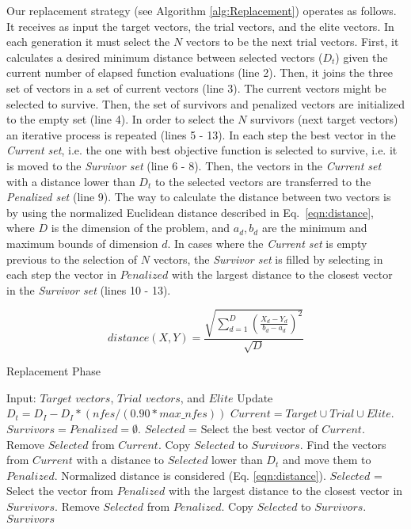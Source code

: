 Our replacement strategy (see Algorithm \ref{alg:Replacement}) operates as follows.
%
It receives as input the target vectors, the trial vectors, and the elite vectors.
%
In each generation it must select the $N$ vectors to be the next trial vectors.
%
First, it calculates a desired minimum distance between selected vectors ($D_t$) given the current number of elapsed function evaluations (line 2).
%
Then, it joins the three set of vectors in a set of current vectors (line 3).
%
The current vectors might be selected to survive.
%
Then, the set of survivors and penalized vectors are initialized to the empty set (line 4).
%
In order to select the $N$ survivors (next target vectors) an iterative process is repeated (lines 5 - 13).
%
In each step the best vector in the \textit{Current set}, i.e. the one with best objective function is selected
to survive, i.e. it is moved to the \textit{Survivor set} (line 6 - 8).
%
Then, the vectors in the \textit{Current set} with a distance lower than $D_t$ to the selected vectors are transferred to the \textit{Penalized set} (line 9).
%
The way to calculate the distance between two vectors is by using the normalized Euclidean distance described in Eq.~\ref{eqn:distance}, where $D$ is the dimension of the problem, and $a_d, b_d$ are the minimum and maximum bounds of dimension $d$.
%
%
In cases where the \textit{Current set} is empty previous to the selection of $N$ vectors, the \textit{Survivor set} is filled by selecting in each step 
the vector in $Penalized$ with the largest distance to the closest vector in the \textit{Survivor set} (lines 10 - 13).

\begin{equation}\label{eqn:distance}
distance ( X, Y ) = \frac{\sqrt{ \sum_{d=1}^D \left ( \frac{X_d - Y_d}{b_d - a_d} \right )^2  }} {\sqrt{D}}
\end{equation}


\begin{algorithm}[t]
  \scriptsize
	\caption{Replacement Phase} \label{alg:Replacement}
	\begin{algorithmic}[1]
	\STATE Input: $Target$ $vectors$, $Trial$ $vectors$, and $Elite$
	\STATE Update $D_t = D_I - D_I *(nfes/(0.90*max\_nfes)) $ 
	\STATE $Current = Target \cup Trial\cup Elite$.
	\STATE $Survivors = Penalized = \emptyset$.
	   \STATE $Selected$ = Select the best vector of $Current$.
		 \STATE Remove $Selected$ from $Current$.
	   \STATE Copy $Selected$ to $Survivors$.
	   \STATE Find the vectors from $Current$ with a distance to $Selected$ lower than $D_t$ and move them to $Penalized$. Normalized distance is considered (Eq. \ref{eqn:distance}).
	\ENDWHILE
	   \STATE $Selected$ = Select the vector from $Penalized$ with the largest distance to the closest vector in $Survivors$.
		 \STATE Remove $Selected$ from $Penalized$.
	   \STATE Copy $Selected$ to $Survivors$.
	\ENDWHILE
  \RETURN $Survivors$
\end{algorithmic}
\end{algorithm}


